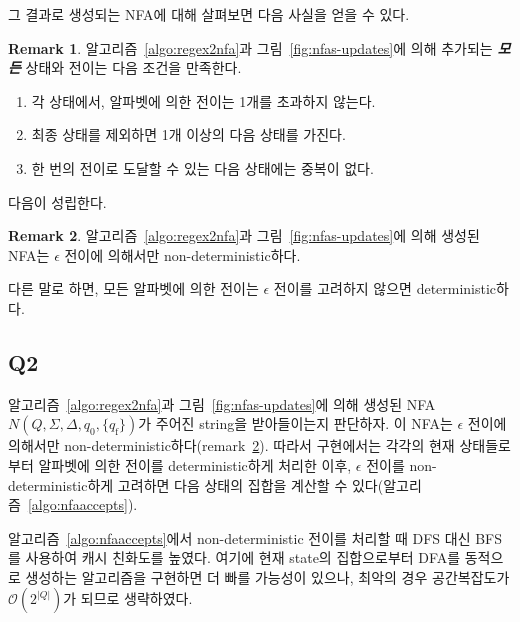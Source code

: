 \documentclass[a4paper,10pt]{scrartcl}
\numberwithin{figure}{section}
\numberwithin{table}{section}
\theoremstyle{definition}
\newtheorem{remark}{Remark}[section]
\begin{document}
그 결과로 생성되는 NFA에 대해 살펴보면 다음 사실을 얻을 수 있다.

\begin{remark}
  \label{remark:regex}
  알고리즘~\ref{algo:regex2nfa}과 그림~\ref{fig:nfas-updates}에 의해 추가되는 \textbf{\textsl{모든}} 상태와 전이는 다음 조건을 만족한다.
  \begin{enumerate}[label=\roman*.]
    \item 각 상태에서, 알파벳에 의한 전이는 1개를 초과하지 않는다.
    \item 최종 상태를 제외하면 1개 이상의 다음 상태를 가진다.
    \item 한 번의 전이로 도달할 수 있는 다음 상태에는 중복이 없다.
  \end{enumerate}
\end{remark}

 다음이 성립한다.

\begin{remark}
  \label{remark:det}
  알고리즘~\ref{algo:regex2nfa}과 그림~\ref{fig:nfas-updates}에 의해 생성된 NFA는 $\epsilon$ 전이에 의해서만 non-deterministic하다.
\end{remark}

\noindent 다른 말로 하면, 모든 알파벳에 의한 전이는 $\epsilon$ 전이를 고려하지 않으면 deterministic하다.

\subsection{Q2}
\label{subsec:q2}

알고리즘~\ref{algo:regex2nfa}과 그림~\ref{fig:nfas-updates}에 의해 생성된 NFA $N(Q, \Sigma, \Delta, q_0, \{q_{\mathrm{f}}\})$가 주어진 string을 받아들이는지 판단하자. 이 NFA는 $\epsilon$ 전이에 의해서만 non-deterministic하다(remark~\ref{remark:det}). 따라서 구현에서는 각각의 현재 상태들로부터 알파벳에 의한 전이를 deterministic하게 처리한 이후, $\epsilon$ 전이를 non-deterministic하게 고려하면 다음 상태의 집합을 계산할 수 있다(알고리즘~\ref{algo:nfaaccepts}).

알고리즘~\ref{algo:nfaaccepts}에서 non-deterministic 전이를 처리할 때 DFS 대신 BFS를 사용하여 캐시 친화도를 높였다. 여기에 현재 state의 집합으로부터 DFA를 동적으로 생성하는 알고리즘을 구현하면 더 빠를 가능성이 있으나, 최악의 경우 공간복잡도가 $\mathcal{O}(2^{|Q|})$가 되므로 생략하였다.

\pagebreak
\end{document}
